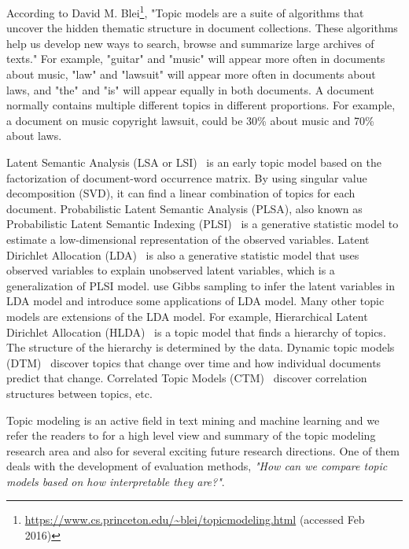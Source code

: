 According to David M. Blei\footnote{\url{https://www.cs.princeton.edu/~blei/topicmodeling.html} (accessed Feb 2016)}, "Topic models are a suite of algorithms that uncover the hidden thematic structure in document collections. These algorithms help us develop new ways to search, browse and summarize large archives of texts." For example, "guitar" and "music" will appear more often in documents about music, "law" and "lawsuit" will appear more often in documents about laws, and "the" and "is" will appear equally in both documents. A document normally contains multiple different topics in different proportions. For example, a document on music copyright lawsuit, could be 30\% about music and 70\% about laws.

Latent Semantic Analysis (LSA or LSI)~\cite{chp2deerwester1990indexing} \cite{chp2landauer1997solution} is an early topic model based on the factorization of document-word occurrence matrix. By using singular value decomposition (SVD), it can find a linear combination of topics for each document.
Probabilistic Latent Semantic Analysis (PLSA), also known as Probabilistic Latent Semantic Indexing (PLSI)~\cite{chp2papadimitriou1998latent}\cite{chp2hofmann1999probabilistic} is a generative statistic model to estimate a low-dimensional representation of the observed variables. Latent Dirichlet Allocation (LDA)~\cite{blei2003latent} is also a generative statistic model that uses observed variables to explain unobserved latent variables, which is a generalization of PLSI model. \cite{griffiths2004finding} \cite{chp2griffiths2002probabilistic} use Gibbs sampling to infer the latent variables in LDA model and introduce some applications of LDA model. Many other topic models are extensions of the LDA model. For example, Hierarchical Latent Dirichlet Allocation (HLDA)~\cite{chp2DBLP:conf/nips/2003} is a topic model that finds a hierarchy of topics. The structure of the hierarchy is determined by the data. Dynamic topic models (DTM)~\cite{chp2blei2006dynamic} discover topics that change over time and how individual documents predict that change. Correlated Topic Models (CTM)~\cite{chp2blei2006correlated} discover correlation structures between topics, etc.

Topic modeling is an active field in text mining and machine learning and we refer the readers to \cite{chp2Blei:2012:PTM:2133806.2133826} for a high level view and summary of the topic modeling research area and also for several exciting future research directions. One of them deals with the development of evaluation methods, \textit{"How can we compare topic models based on how interpretable they are?"}.

